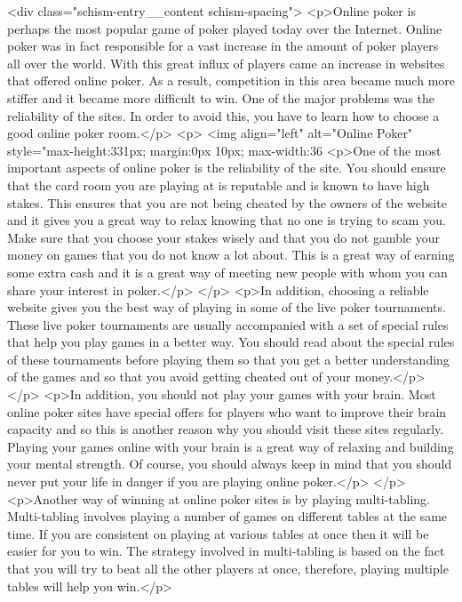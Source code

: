 {		<div class="schism-entry__content schism-spacing">			<p>Online poker is perhaps the most popular game of poker played today over the Internet. Online poker was in fact responsible for a vast increase in the amount of poker players all over the world. With this great influx of players came an increase in websites that offered online poker. As a result, competition in this area became much more stiffer and it became more difficult to win. One of the major problems was the reliability of the sites. In order to avoid this, you have to learn how to choose a good online poker room.</p>
<p> <img align="left" alt="Online Poker" style="max-height:331px; margin:0px 10px; max-width:36%
<p>One of the most important aspects of online poker is the reliability of the site. You should ensure that the card room you are playing at is reputable and is known to have high stakes. This ensures that you are not being cheated by the owners of the website and it gives you a great way to relax knowing that no one is trying to scam you. Make sure that you choose your stakes wisely and that you do not gamble your money on games that you do not know a lot about. This is a great way of earning some extra cash and it is a great way of meeting new people with whom you can share your interest in poker.</p>
</p>
<p>In addition, choosing a reliable website gives you the best way of playing in some of the live poker tournaments. These live poker tournaments are usually accompanied with a set of special rules that help you play games in a better way. You should read about the special rules of these tournaments before playing them so that you get a better understanding of the games and so that you avoid getting cheated out of your money.</p>
</p>
<p>In addition, you should not play your games with your brain. Most online poker sites have special offers for players who want to improve their brain capacity and so this is another reason why you should visit these sites regularly. Playing your games online with your brain is a great way of relaxing and building your mental strength. Of course, you should always keep in mind that you should never put your life in danger if you are playing online poker.</p>
</p>
<p>Another way of winning at online poker sites is by playing multi-tabling. Multi-tabling involves playing a number of games on different tables at the same time. If you are consistent on playing at various tables at once then it will be easier for you to win. The strategy involved in multi-tabling is based on the fact that you will try to beat all the other players at once, therefore, playing multiple tables will help you win.</p>
}
